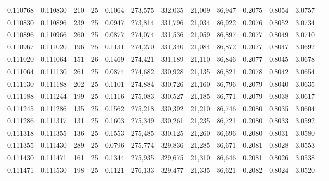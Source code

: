 \begin{tabular}{rrrrrrrrrrrrr}
0.110768 & 0.110830 &   210 &  25 &                                     0.1064 & 273,575 & 332,035 &  21,009 &  86,947 & 0.2075 & 0.8054 & 3.0757 \\
0.110830 & 0.110896 &   239 &  25 &                                     0.0947 & 273,814 & 331,796 &  21,034 &  86,922 & 0.2076 & 0.8052 & 3.0734 \\
0.110896 & 0.110966 &   260 &  25 &                                     0.0877 & 274,074 & 331,536 &  21,059 &  86,897 & 0.2077 & 0.8049 & 3.0710 \\
0.110967 & 0.111020 &   196 &  25 &                                     0.1131 & 274,270 & 331,340 &  21,084 &  86,872 & 0.2077 & 0.8047 & 3.0692 \\
0.111020 & 0.111064 &   151 &  26 &                                     0.1469 & 274,421 & 331,189 &  21,110 &  86,846 & 0.2077 & 0.8045 & 3.0678 \\
0.111064 & 0.111130 &   261 &  25 &                                     0.0874 & 274,682 & 330,928 &  21,135 &  86,821 & 0.2078 & 0.8042 & 3.0654 \\
0.111130 & 0.111188 &   202 &  25 &                                     0.1101 & 274,884 & 330,726 &  21,160 &  86,796 & 0.2079 & 0.8040 & 3.0635 \\
0.111188 & 0.111244 &   199 &  25 &                                     0.1116 & 275,083 & 330,527 &  21,185 &  86,771 & 0.2079 & 0.8038 & 3.0617 \\
0.111245 & 0.111286 &   135 &  25 &                                     0.1562 & 275,218 & 330,392 &  21,210 &  86,746 & 0.2080 & 0.8035 & 3.0604 \\
0.111286 & 0.111317 &   131 &  25 &                                     0.1603 & 275,349 & 330,261 &  21,235 &  86,721 & 0.2080 & 0.8033 & 3.0592 \\
0.111318 & 0.111355 &   136 &  25 &                                     0.1553 & 275,485 & 330,125 &  21,260 &  86,696 & 0.2080 & 0.8031 & 3.0580 \\
0.111355 & 0.111430 &   289 &  25 &                                     0.0796 & 275,774 & 329,836 &  21,285 &  86,671 & 0.2081 & 0.8028 & 3.0553 \\
0.111430 & 0.111471 &   161 &  25 &                                     0.1344 & 275,935 & 329,675 &  21,310 &  86,646 & 0.2081 & 0.8026 & 3.0538 \\
0.111471 & 0.111530 &   198 &  25 &                                     0.1121 & 276,133 & 329,477 &  21,335 &  86,621 & 0.2082 & 0.8024 & 3.0520 \\

\end{tabular}
